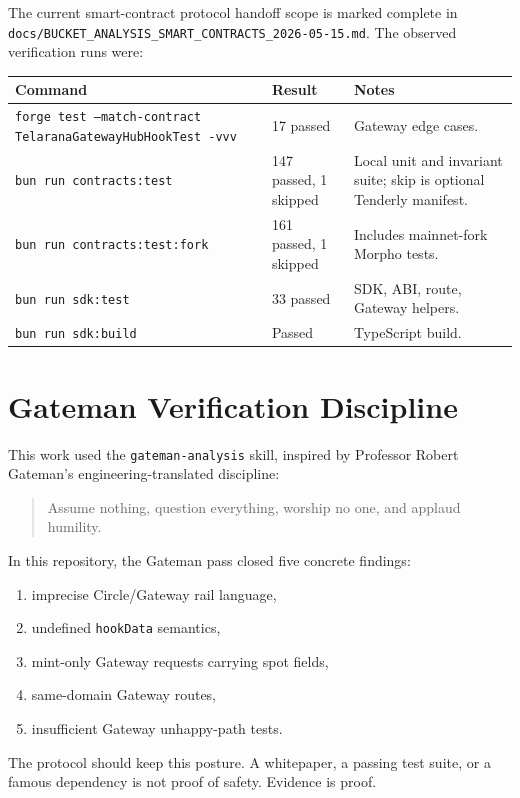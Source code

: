 \documentclass[11pt]{article}
\begin{document}
The current smart-contract protocol handoff scope is marked complete in
\texttt{docs/BUCKET\_ANALYSIS\_SMART\_CONTRACTS\_2026-05-15.md}. The observed
verification runs were:

\begin{center}
\begin{tabular}{lll}
\toprule
Command & Result & Notes \\
\midrule
\texttt{forge test --match-contract TelaranaGatewayHubHookTest -vvv} &
17 passed & Gateway edge cases. \\
\texttt{bun run contracts:test} & 147 passed, 1 skipped & Local unit and
invariant suite; skip is optional Tenderly manifest. \\
\texttt{bun run contracts:test:fork} & 161 passed, 1 skipped & Includes
mainnet-fork Morpho tests. \\
\texttt{bun run sdk:test} & 33 passed & SDK, ABI, route, Gateway helpers. \\
\texttt{bun run sdk:build} & Passed & TypeScript build. \\
\bottomrule
\end{tabular}
\end{center}

\section{Gateman Verification Discipline}

This work used the \texttt{gateman-analysis} skill, inspired by Professor
Robert Gateman's engineering-translated discipline:

\begin{quote}
Assume nothing, question everything, worship no one, and applaud humility.
\end{quote}

In this repository, the Gateman pass closed five concrete findings:

\begin{enumerate}
  \item imprecise Circle/Gateway rail language,
  \item undefined \texttt{hookData} semantics,
  \item mint-only Gateway requests carrying spot fields,
  \item same-domain Gateway routes,
  \item insufficient Gateway unhappy-path tests.
\end{enumerate}

The protocol should keep this posture. A whitepaper, a passing test suite, or a
famous dependency is not proof of safety. Evidence is proof.
\end{document}
